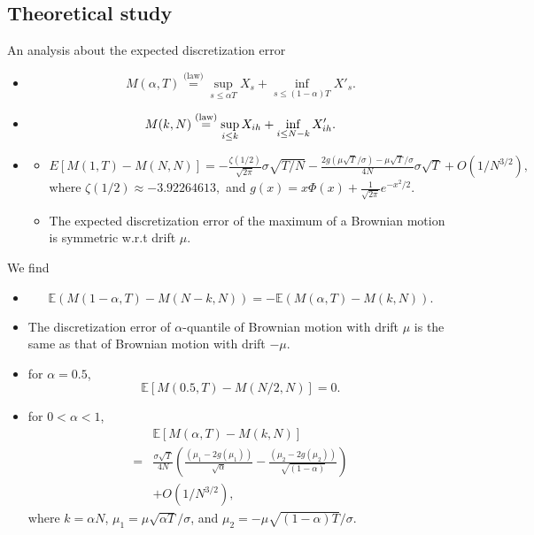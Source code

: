 \documentclass[cjk,10pt]{beamer}
\def\eqlaw{{\stackrel{\text{(law)}}{=}}}
\begin{document}
\subsection{Theoretical study}
\begin{frame}{An analysis about the expected discretization error}\small
\begin{itemize}
\item 
\cite{Dassios1995} 
\[
M(\alpha, T) \eqlaw \sup_{s \leq \alpha T} X_s + \inf_{s\leq (1-\alpha)T} X'_s.
\]
\item
\cite{Wendel1960}
\[
M(k,N)\stackrel{\rm(law)}{=}\sup_{i\le k}X_{ih} + \inf_{i\le N-k}X'_{ih}.
\]

\item
\cite{Janssen2008}
\begin{itemize}
\item$\displaystyle
E[M(1,T)-M(N,N)]
= -\frac{\zeta(1/2)}{\sqrt{2\pi}}\sigma\sqrt{T/N} 
 -\frac{2g(\mu\sqrt{T}/\sigma)-\mu\sqrt{T}/ \sigma}{4N}\sigma\sqrt{T} 
 +O(1/N^{3/2}),$
where 
$
\zeta(1/2) \approx -3.92264613,
$
and 
$
g(x)=x \Phi(x) + \frac{1}{\sqrt{2\pi}} e^{-{x^2 /2 }}.
$
\item
The expected discretization error of the maximum of a Brownian motion is symmetric w.r.t drift $\mu$.
\end{itemize}
\end{itemize}
\end{frame}

\begin{frame}\small
We find 
\begin{itemize}
\item
\begin{equation}
\mathbb {E}({M(1-\alpha,T) - M(N-k,N)})
=-\mathbb{E}({M(\alpha,T) -  M(k,N)}).
\end{equation}
\item
The discretization error of $\alpha$-quantile of Brownian motion with drift $\mu$ is the same as that of Brownian motion with drift $-\mu$.

\item
for $\alpha=0.5$, 
\begin{equation}
\mathbb{E} [{M(0.5,T) - M(N/2,N)}]=0.
\end{equation}

\item
for $0<\alpha<1$,
\begin{equation}
\begin{split}
&\mathbb{E} [{M(\alpha,T) -  M(k,N)}]\\
=&\frac{\sigma\sqrt{T}}{4N}\left(\frac{(\mu_1 - 2g(\mu_1))}{\sqrt\alpha} - \frac{(\mu_2 - 2g(\mu_2))}{\sqrt{(1-\alpha)}}\right) \\
& + O(1/N^{{3}/{2}}),
\end{split}
\end{equation}
where $k = \alpha N$, $\mu_1 =\mu\sqrt{\alpha T}/\sigma$, and $\mu_2 =-\mu\sqrt{(1-\alpha)T}/\sigma$.

\end{itemize}
\end{frame}
\end{document}

